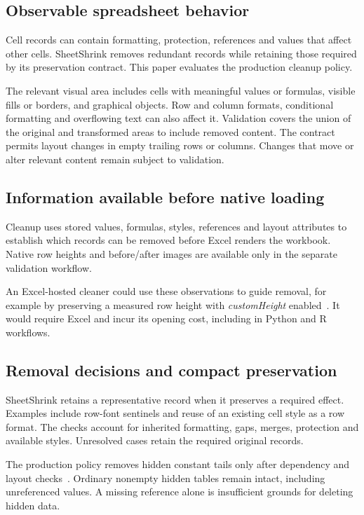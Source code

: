 \subsection{Observable spreadsheet behavior}
Cell records can contain formatting, protection, references and values that
affect other cells. SheetShrink removes redundant records while retaining those
required by its preservation contract. This paper evaluates the production
cleanup policy.

The relevant visual area includes cells with meaningful values or formulas,
visible fills or borders, and graphical objects. Row and column formats,
conditional formatting and overflowing text can also affect it. Validation covers
the union of the original and transformed areas to include removed content.
The contract permits layout changes in empty trailing rows or columns. Changes
that move or alter relevant content remain subject to validation.

\subsection{Information available before native loading}
Cleanup uses stored values, formulas, styles, references and layout attributes
to establish which records can be removed before Excel renders the workbook.
Native row heights and before/after images are available only in the separate
validation workflow.

An Excel-hosted cleaner could use these observations to guide removal, for example
by preserving a measured row height with \emph{customHeight} enabled~\cite{customheight}.
It would require Excel and incur its opening cost, including in Python and R
workflows.

\subsection{Removal decisions and compact preservation}
SheetShrink retains a representative record when it preserves a required effect.
Examples include row-font sentinels and reuse of an existing cell style as a row
format. The checks account for inherited formatting, gaps, merges, protection
and available styles. Unresolved cases retain the required original records.

The production policy removes hidden constant tails only after dependency and
layout checks~\cite{sheetshrinkcontract}. Ordinary nonempty hidden tables remain intact, including
unreferenced values. A missing reference alone is insufficient grounds for
deleting hidden data.

